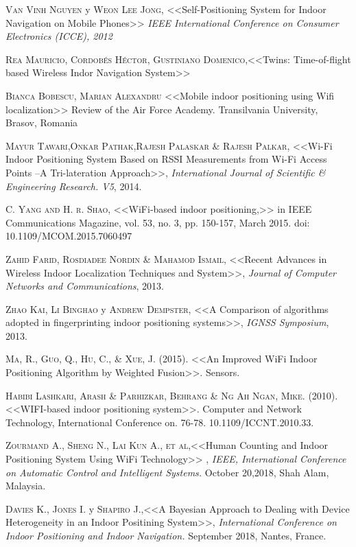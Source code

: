 \documentclass[12pt]{report}
\begin{document}
\begin{thebibliography}{X}
 \textsc{Van Vinh Nguyen} y \textsc{Weon Lee Jong}, <<Self-Positioning System for Indoor Navigation on Mobile Phones>> \textit{IEEE International Conference on Consumer Electronics (ICCE), 2012}

 \textsc{Rea Mauricio, Cordobés Héctor, Gustiniano Domenico},<<Twins: Time-of-flight based Wireless Indor Navigation System>>

 \textsc{Bianca Bobescu, Marian Alexandru} <<Mobile indoor positioning using Wifi localization>> Review of the Air Force Academy. Transilvania University, Brasov, Romania

 \textsc{Mayur Tawari,Onkar Pathak,Rajesh Palaskar \& Rajesh Palkar}, <<Wi-Fi Indoor Positioning System Based on RSSI Measurements from Wi-Fi Access Points –A Tri-lateration Approach>>, \textit{International Journal of Scientific \& Engineering Research. V5}, 2014.

 \textsc{C. Yang and H. r. Shao}, <<WiFi-based indoor positioning,>> in IEEE Communications Magazine, vol. 53, no. 3, pp. 150-157, March 2015. doi: 10.1109/MCOM.2015.7060497

 \textsc{Zahid Farid, Rosdiadee Nordin \& Mahamod Ismail}, <<Recent Advances in Wireless Indoor Localization Techniques and System>>, \textit{Journal of Computer Networks and Communications}, 2013.

 \textsc{Zhao Kai, Li Binghao} y \textsc{Andrew Dempster}, <<A Comparison of algorithms adopted in fingerprinting indoor positioning systems>>, \textit{IGNSS Symposium}, 2013.

 \textsc{Ma, R., Guo, Q., Hu, C., \& Xue, J.} (2015). <<An Improved WiFi Indoor Positioning Algorithm by Weighted Fusion>>. Sensors.

 \textsc{Habibi Lashkari, Arash \& Parhizkar, Behrang \& Ng Ah Ngan, Mike.} (2010). <<WIFI-based indoor positioning system>>. Computer and Network Technology, International Conference on. 76-78. 10.1109/ICCNT.2010.33. 

 \textsc{Zourmand A., Sheng N., Lai Kun A., et al},<<Human Counting and Indoor Positioning System Using WiFi Technology>> , \textit{IEEE, International Conference on Automatic Control and Intelligent Systems.} October 20,2018, Shah Alam, Malaysia.

 \textsc{Davies K., Jones I.} y \textsc{Shapiro J.},<<A Bayesian Approach to Dealing with Device Heterogeneity in an Indoor Positining System>>, \textit{International Conference on Indoor Positioning and Indoor Navigation.} September 2018, Nantes, France.


\end{thebibliography}
\end{document}
